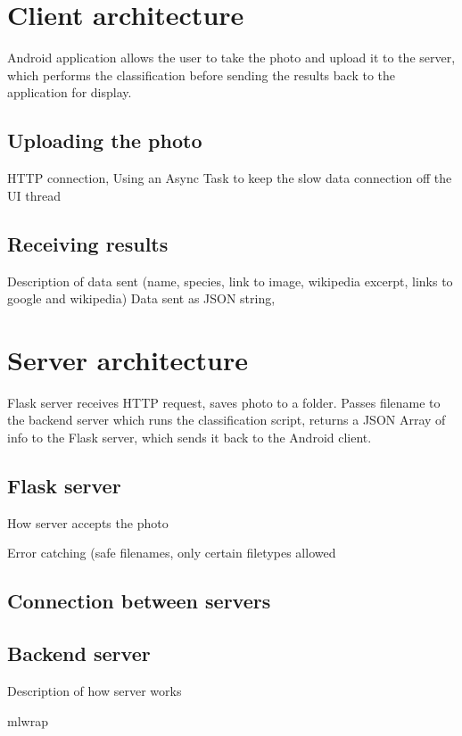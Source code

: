 \documentclass[11pt, a4paper]{report}
\begin{document}
\section{Client architecture}
Android application allows the user to take the photo and upload it to the server, which performs the classification before sending the results back to the application for display.

\subsection{Uploading the photo}
HTTP connection, 
Using an Async Task to keep the slow data connection off the UI thread

\subsection{Receiving results}

Description of data sent (name, species, link to image, wikipedia excerpt, links to google and wikipedia)
Data sent as JSON string,



\section{Server architecture}
Flask server receives HTTP request, saves photo to a folder. Passes filename to the backend server which runs the classification script, returns a JSON Array of info to the Flask server, which sends it back to the Android client. 

\subsection{Flask server}

How server accepts the photo

Error catching (safe filenames, only certain filetypes allowed


\subsection{Connection between servers}

\subsection{Backend server}
Description of how server works

mlwrap
\end{document}
